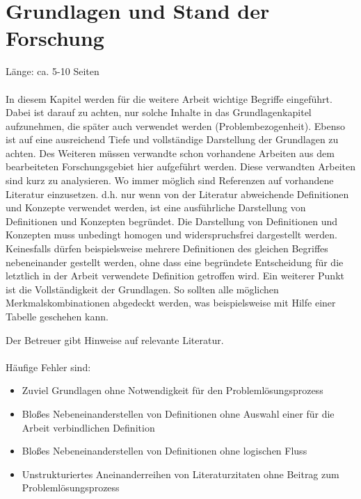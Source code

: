 \chapter{Grundlagen und Stand der Forschung}
Länge: ca. 5-10 Seiten\\\\

\noindent In diesem Kapitel werden für die weitere Arbeit wichtige Begriffe eingeführt. Dabei ist darauf zu achten, nur solche Inhalte in das Grundlagenkapitel aufzunehmen, die später auch verwendet werden (Problembezogenheit). Ebenso ist auf eine ausreichend Tiefe und vollständige Darstellung der Grundlagen zu achten. Des Weiteren müssen verwandte schon vorhandene Arbeiten aus dem bearbeiteten Forschungsgebiet hier aufgeführt werden. Diese verwandten Arbeiten sind kurz zu analysieren. Wo immer möglich sind Referenzen auf vorhandene Literatur einzusetzen. d.h. nur wenn von der Literatur abweichende Definitionen und Konzepte verwendet werden, ist eine ausführliche Darstellung von Definitionen und Konzepten begründet. Die Darstellung von Definitionen und Konzepten muss unbedingt homogen und widerspruchsfrei dargestellt werden. Keinesfalls dürfen beispielsweise mehrere Definitionen des gleichen Begriffes nebeneinander gestellt werden, ohne dass eine begründete Entscheidung für die letztlich in der Arbeit verwendete Definition getroffen wird. Ein weiterer Punkt ist die Vollständigkeit der Grundlagen. So sollten alle möglichen Merkmalskombinationen abgedeckt werden, was beispielsweise mit Hilfe einer Tabelle geschehen kann.

\noindent Der Betreuer gibt Hinweise auf relevante Literatur.\\\\

\noindent Häufige Fehler sind:
\begin{itemize}
	\item Zuviel Grundlagen ohne Notwendigkeit für den Problemlösungsprozess
	\item	Bloßes Nebeneinanderstellen von Definitionen ohne Auswahl einer für die Arbeit verbindlichen Definition
	\item Bloßes Nebeneinanderstellen von Definitionen ohne logischen Fluss
	\item	Unstrukturiertes Aneinanderreihen von Literaturzitaten ohne Beitrag zum Problemlösungsprozess
\end{itemize}
